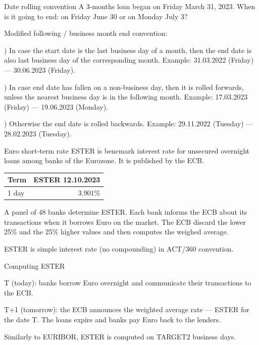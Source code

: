 \documentclass{beamer}
\begin{document}
\begin{frame}{Date rolling convention}
\justify
A 3-months loan began on Friday March 31, 2023. When is it going to end: on Friday June 30 or on Monday July 3?

\justify
Modified following / business month end convention:

) In case the start date is the last business day of a month, then the end date is also last business day of the corresponding month. Example: 31.03.2022 (Friday) --- 30.06.2023 (Friday).

) In case end date has fallen on a non-business day, then it is rolled forwards, unless the nearest business day is in the following month. Example: 17.03.2023 (Friday) --- 19.06.2023 (Monday).

) Otherwise the end date is rolled backwards. Example: 29.11.2022 (Tuesday) --- 28.02.2023 (Tuesday).
\end{frame}



\begin{frame}{Euro short-term rate}
\justify
\alert{ESTER} is bencmark interest rate for unsecured overnight loans among banks of the Eurozone. It is published by the ECB.

\justify
\centering
\begin{tabular}{l|r}
Term  & ESTER 12.10.2023 \\ \hline
1 day & $3.901\%$
\end{tabular}

\justify
A panel of 48 banks determine ESTER. Each bank informs the ECB about its transactions when it borrows Euro on the market. The ECB discard the lower 25\%  and the 25\% higher values and then computes the weighed average.

\justify
ESTER is simple interest rate (no compounding) in ACT/360 convention.
\end{frame}



\begin{frame}{Computing ESTER}
\justify
\centering
{}

\justify
T (today): banks borrow Euro overnight and communicate their transactions to the ECB.

T+1 (tomorrow): the ECB announces the weighted average rate --- ESTER for the date T. The loans expire and banks pay Euro back to the lenders.

\justify
Similarly to EURIBOR, ESTER is computed on TARGET2 business days.
\end{frame}
\end{document}
